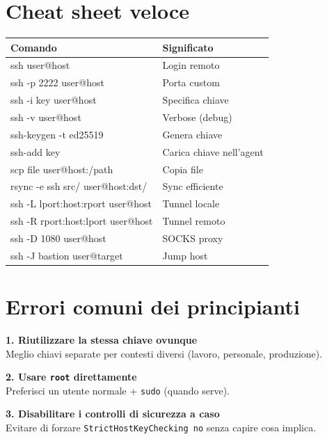 \documentclass[a4paper,11pt]{article}
\begin{document}
\section{Cheat sheet veloce}
\begin{center}
\renewcommand{\arraystretch}{1.25}
\begin{tabularx}{\textwidth}{>{\ttfamily}l X}
\toprule
Comando & Significato \\
\midrule
ssh user@host & Login remoto \\
ssh -p 2222 user@host & Porta custom \\
ssh -i key user@host & Specifica chiave \\
ssh -v user@host & Verbose (debug) \\
ssh-keygen -t ed25519 & Genera chiave \\
ssh-add key & Carica chiave nell'agent \\
scp file user@host:/path & Copia file \\
rsync -e ssh src/ user@host:dst/ & Sync efficiente \\
ssh -L lport:host:rport user@host & Tunnel locale \\
ssh -R rport:host:lport user@host & Tunnel remoto \\
ssh -D 1080 user@host & SOCKS proxy \\
ssh -J bastion user@target & Jump host \\
\bottomrule
\end{tabularx}
\end{center}

\section{Errori comuni dei principianti}
\begin{infobox}
\textbf{1. Riutilizzare la stessa chiave ovunque} \\
Meglio chiavi separate per contesti diversi (lavoro, personale, produzione).

\medskip
\textbf{2. Usare \texttt{root} direttamente} \\
Preferisci un utente normale + \texttt{sudo} (quando serve).

\medskip
\textbf{3. Disabilitare i controlli di sicurezza a caso} \\
Evitare di forzare \texttt{StrictHostKeyChecking no} senza capire cosa implica.
\end{infobox}

\end{document}
